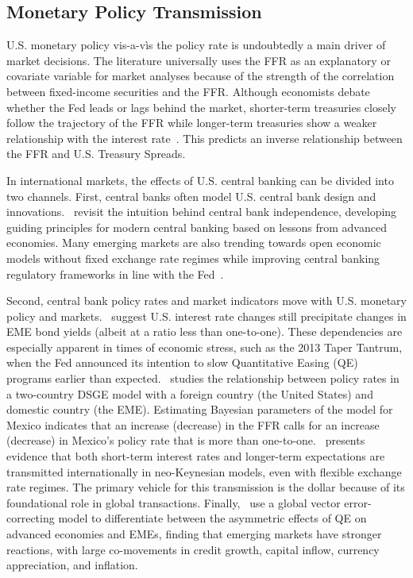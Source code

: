 \documentclass[12pt]{article}
\begin{document}
\subsection{Monetary Policy Transmission}
U.S. monetary policy vis-a-v\`{i}s the policy rate is undoubtedly a main driver of market decisions. The literature universally uses the FFR as an explanatory or covariate variable for market analyses because of the strength of the correlation between fixed-income securities and the FFR. Although economists debate whether the Fed leads or lags behind the market, shorter-term treasuries closely follow the trajectory of the FFR while longer-term treasuries show a weaker relationship with the interest rate~\parencite{reinhart5}. This predicts an inverse relationship between the FFR and U.S. Treasury Spreads.

In international markets, the effects of U.S. central banking can be divided into two channels. First, central banks often model U.S. central bank design and innovations.~\textcite{balls18} revisit the intuition behind central bank independence, developing guiding principles for modern central banking based on lessons from advanced economies. Many emerging markets are also trending towards open economic models without fixed exchange rate regimes while improving central banking regulatory frameworks in line with the Fed~\parencite{dudley14}.

Second, central bank policy rates and market indicators move with U.S. monetary policy and markets.~\textcite{klemm14} suggest U.S. interest rate changes still precipitate changes in EME bond yields (albeit at a ratio less than one-to-one). These dependencies are especially apparent in times of economic stress, such as the 2013 Taper Tantrum, when the Fed announced its intention to slow Quantitative Easing (QE) programs earlier than expected.~\textcite{Hernandez17} studies the relationship between policy rates in a two-country DSGE model with a foreign country (the United States) and domestic country (the EME). Estimating Bayesian parameters of the model for Mexico indicates that an increase (decrease) in the FFR calls for an increase (decrease) in Mexico's policy rate that is more than one-to-one.~\textcite{rey16} presents evidence that both short-term interest rates and longer-term expectations are transmitted internationally in neo-Keynesian models, even with flexible exchange rate regimes. The primary vehicle for this transmission is the dollar because of its foundational role in global transactions. Finally,~\textcite{chen11} use a global vector error-correcting model to differentiate between the asymmetric effects of QE on advanced economies and EMEs, finding that emerging markets have stronger reactions, with large co-movements in credit growth, capital inflow, currency appreciation, and inflation.
\end{document}
